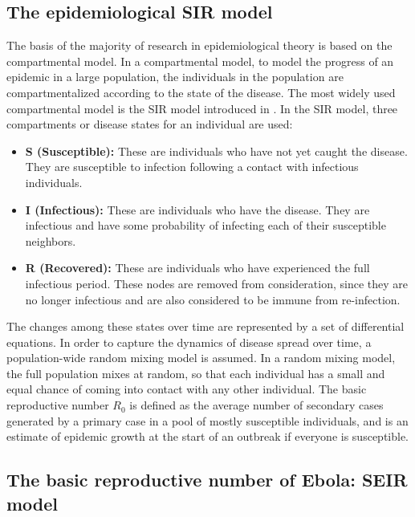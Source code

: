 \documentclass[10pt, journal,onecolumn]{IEEEtran}
\begin{document}
\subsection{\textbf{The epidemiological SIR model \citep{very_old_paper}}}
\label{SubSec:SIR}

The basis of the majority of research in epidemiological theory is based on the compartmental model.
In a compartmental model, to model the progress of an epidemic in a large population, the
individuals in the population are compartmentalized according to the state of the disease. The most
widely used compartmental model is the SIR model introduced in \citep{very_old_paper}. In the SIR model,
three compartments or disease states for an individual are used:

\begin{itemize}
\item \textbf{S (Susceptible):} These are individuals who have not yet caught the disease. They are
  susceptible to infection following a contact with infectious individuals.
\item \textbf{I (Infectious):} These are individuals who have the disease. They are infectious and
  have some probability of infecting each of their susceptible neighbors.
\item \textbf{R (Recovered):} These are individuals who have experienced the full infectious period.
  These nodes are removed from consideration, since they are no longer infectious and are also
  considered to be immune from re-infection.
\end{itemize}

The changes among these states over time are represented by a set of differential equations. In
order to capture the dynamics of disease spread over time, a population-wide random mixing model is
assumed. In a random mixing model, the full population mixes at random, so that each individual has a small
and equal chance of coming into contact with any other individual. The basic reproductive number $R_0$
is defined as the average number of secondary cases generated by a primary case in a pool of mostly
susceptible individuals, and is an estimate of epidemic growth at the start of an outbreak if
everyone is susceptible.


\subsection{\textbf{The basic reproductive number of Ebola: SEIR model \citep{chowell2004basic}}}
\end{document}
